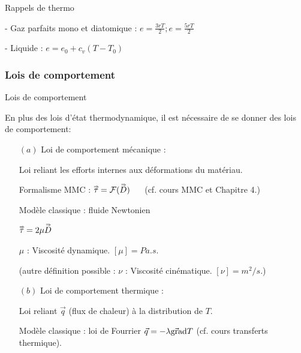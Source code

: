 \begin{frame}{Rappels de thermo}
\begin{itemize}
- Gaz parfaits mono et diatomique : $e = \frac{3 r T}{2}  ; e = \frac{5 r T}{2} $

- Liquide :  $e = e_0 + c_v (T-T_0)$



\end{itemize}




\end{frame}


\subsubsection{Lois de comportement}

\begin{frame}{Lois de comportement}

En plus des lois d'état thermodynamique, il est nécessaire de se donner des lois de comportement:

\begin{itemize}
\item[$(a)$]  Loi de comportement mécanique :

Loi reliant les efforts internes aux déformations du matériau.
\smallskip \pause 

Formalisme MMC :  $\accentset{\Rightarrow}{\tau} = {\cal F}  ( \accentset{\Rightarrow}{ D} )$ $ \quad$ (cf. cours MMC et  Chapitre 4.)

\smallskip \pause 

Modèle classique : fluide Newtonien 

 $\accentset{\Rightarrow}{\tau} = 2 \mu \accentset{\Rightarrow}{D} $

$ \mu$ : Viscosité dynamique. $[\mu] = Pa. s$.

(autre définition possible : $ \nu$ : Viscosité cinématique. $[\nu] = m^2 /s$.)

\item[$(b)$]  Loi de comportement thermique :

Loi reliant $\vec q$ (flux de chaleur) à la distribution de $T$.

\smallskip \pause 

Modèle classique : loi de Fourrier $\vec q = - \lambda \vec{\mbox{\rm gra}}\mbox{\rm d} T$ (cf. cours transferts thermique).

\end{itemize}


\end{frame}

